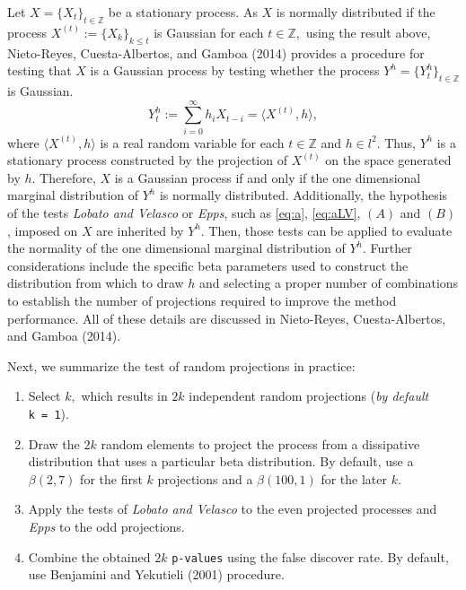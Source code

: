 Let \(X = \{X_t\}_{t\in\mathbb{Z}}\) be a stationary process. As \(X\) is normally distributed if the process \(X^{(t)} := \{X_k\}_{k \leq t}\) is Gaussian for each \(t\in\mathbb{Z},\) using the result above, Nieto-Reyes, Cuesta-Albertos, and Gamboa (2014) provides a procedure for testing that \(X\) is a Gaussian process by testing whether the process \(Y^h = \{Y^h_t\}_{t \in \mathbb{Z}}\) is Gaussian.
\begin{equation}
 Y^h_t := \sum_{i=0}^\infty h_i X_{t-i} = \langle X^{ (t) },h \rangle, \label{eq:proj}
\end{equation}
where \(\langle X^{(t)},h \rangle\) is a real random variable for each \(t \in \mathbb{Z}\) and \(h\in l^2\). Thus, \(Y^h\) is a stationary process constructed by the projection of \(X^{(t)}\) on the space generated by \(h.\) Therefore, \(X\) is a Gaussian process if and only if the one dimensional marginal distribution of \(Y^{h}\) is normally distributed. Additionally, the hypothesis of the tests \emph{Lobato and Velasco} or \emph{Epps}, such as \eqref{eq:a}, \eqref{eq:aLV}, \((A)\) and \((B)\), imposed on \(X\) are inherited by \(Y^h\). Then, those tests can be applied to evaluate the normality of the one dimensional marginal distribution of \(Y^h\). Further considerations include the specific beta parameters used to construct the distribution from which to draw \(h\) and selecting a proper number of combinations to establish the number of projections required to improve the method performance. All of these details are discussed in Nieto-Reyes, Cuesta-Albertos, and Gamboa (2014).

Next, we summarize the test of random projections in practice:

\begin{enumerate}
\def\labelenumi{\arabic{enumi}.}
\item
  Select \(k,\) which results in \(2k\) independent random projections (\emph{by default} \texttt{k\ =\ 1}).
\item
  Draw the \(2k\) random elements to project the process from a dissipative distribution that uses a particular beta distribution. By default, use a \(\beta(2,7)\) for the first \(k\) projections and a \(\beta(100,1)\) for the later \(k\).
\item
  Apply the tests of \emph{Lobato and Velasco} to the even projected processes and \emph{Epps} to the odd projections.
\item
  Combine the obtained \(2k\) \texttt{p-values} using the false discover rate. By default, use Benjamini and Yekutieli (2001) procedure.
\end{enumerate}


